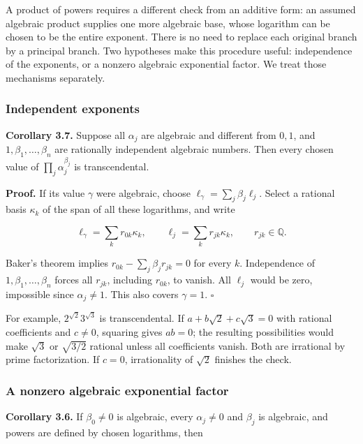 \documentclass[
  11pt,
  a4paper,
]{article}
\begin{document}
A product of powers requires a different check from an additive form: an
assumed algebraic product supplies one more algebraic base, whose
logarithm can be chosen to be the entire exponent. There is no need to
replace each original branch by a principal branch. Two hypotheses make
this procedure useful: independence of the exponents, or a nonzero
algebraic exponential factor. We treat those mechanisms separately.

\subsubsection{Independent exponents}\label{independent-exponents}

\textbf{Corollary 3.7.} Suppose all \(\alpha_j\) are algebraic and
different from \(0,1\), and \(1,\beta_1,\ldots,\beta_n\) are rationally
independent algebraic numbers. Then every chosen value of
\(\prod_j\alpha_j^{\beta_j}\) is transcendental.

\textbf{Proof.} If its value \(\gamma\) were algebraic, choose
\(\ell_\gamma=\sum_j\beta_j\ell_j\). Select a rational basis
\(\kappa_k\) of the span of all these logarithms, and write

\[
\ell_\gamma=\sum_kr_{0k}\kappa_k,\qquad
\ell_j=\sum_kr_{jk}\kappa_k,\qquad r_{jk}\in\mathbb Q.
\]

Baker's theorem implies \(r_{0k}-\sum_j\beta_jr_{jk}=0\) for every
\(k\). Independence of \(1,\beta_1,\ldots,\beta_n\) forces all
\(r_{jk}\), including \(r_{0k}\), to vanish. All \(\ell_j\) would be
zero, impossible since \(\alpha_j\ne1\). This also covers \(\gamma=1\).
\(\square\)

For example, \(2^{\sqrt2}3^{\sqrt3}\) is transcendental. If
\(a+b\sqrt2+c\sqrt3=0\) with rational coefficients and \(c\ne0\),
squaring gives \(ab=0\); the resulting possibilities would make
\(\sqrt3\) or \(\sqrt{3/2}\) rational unless all coefficients vanish.
Both are irrational by prime factorization. If \(c=0\), irrationality of
\(\sqrt2\) finishes the check.

\subsubsection{A nonzero algebraic exponential
factor}\label{a-nonzero-algebraic-exponential-factor}

\textbf{Corollary 3.6.} If \(\beta_0\ne0\) is algebraic, every
\(\alpha_j\ne0\) and \(\beta_j\) is algebraic, and powers are defined by
chosen logarithms, then
\end{document}
